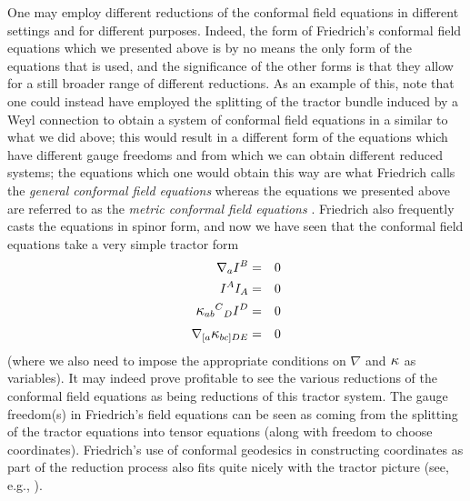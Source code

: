 \documentclass[a4paper,12pt]{amsart}
\newcommand{\kappal}{\mbox{\large{$\kappa$}}}
\theoremstyle{remark}
\begin{document}
One may employ different reductions of the conformal field equations
in different settings and for different purposes. Indeed, the form
of Friedrich's conformal field equations which we presented above
is by no means the only form of the equations that is used, and the
significance of the other forms is that they allow for a still broader
range of different reductions. As an example of this, note that one
could instead have employed the splitting of the tractor bundle induced
by a Weyl connection \cite{CGTracBund} to obtain a system of
conformal field equations in a similar to what we did above; this
would result in a different form of the equations which have different
gauge freedoms and from which we can obtain different reduced systems;
the equations which one would obtain this way are what Friedrich calls
the \emph{general conformal field equations} whereas the equations
we presented above are referred to as the \emph{metric conformal field
equations} \cite{Friedrich-ConfEinsteinEv}. Friedrich also frequently
casts the equations in spinor form, and now we have seen that the
conformal field equations take a very simple tractor form 
\begin{eqnarray*}
\nabla_{a}I^{B} & = & 0\\
I^{A}I_{A} & = & 0\\
\kappal_{ab}{^{C}}_{D}I^{D} & = & 0\\
\nabla_{[a}\kappal_{bc]DE} & = & 0
\end{eqnarray*}
(where we also need to impose the appropriate conditions on $\nabla$
and $\kappal$ as variables). It may indeed prove profitable to see the various reductions of the conformal field equations as being reductions of this tractor system. The gauge freedom(s) in Friedrich's field equations can be seen as coming from the splitting of the tractor equations into tensor equations (along with freedom to choose coordinates). Friedrich's use of conformal geodesics \cite{Friedrich-ConfEinsteinEv} in constructing coordinates as part of the reduction process also fits quite nicely with the tractor picture (see, e.g., \cite{Luebbe, LuebbeTod}).
\end{document}
